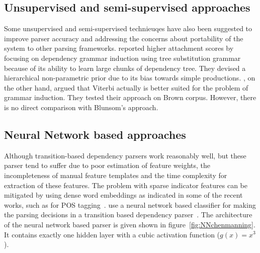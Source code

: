 \subsection{Unsupervised and semi-supervised approaches}




Some unsupervised and semi-supervised technieuqes have also been suggested to improve parser accuracy and addressing the concerns about portability of the system to other parsing frameworks. \cite{blunsom2010unsupervised} reported higher attachment scores by focusing on dependency grammar induction using tree substitution grammar because of its ability to learn large chunks of dependency tree. They devised a hierarchical non-parametric prior due to its bias towards simple productions. \cite{spitkovsky2010viterbi}, on the other hand, argued that Viterbi actually is better suited for the problem of grammar induction. They tested their approach on Brown corpus. However, there is no direct comparison with Blunsom's approach.

\subsection{Neural Network based approaches}

Although transition-based dependency parsers work reasonably well, but these parser tend to suffer due to poor estimation of feature weights, the incompleteness of manual feature templates and the time complexity for extraction of these features. The problem with sparse indicator features can be mitigated by using dense word embeddings as indicated in some of the recent works, such as for POS tagging~\citep{collobert2011natural}. \cite{chen2014fast} use a neural network based classifier for making the parsing decisions in a transition based dependency parser~\citep{Nivre:2004:DDP:1220355.1220365}. The architecture of the neural network based parser is given shown in figure~\ref{fig:NNchenmanning}. It contains exactly one hidden layer with a cubic  activation function ($g(x) = x^3$).

